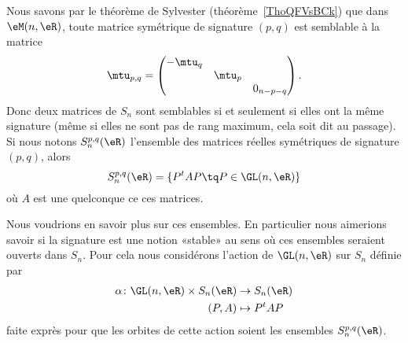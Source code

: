 Nous savons par le théorème de Sylvester (théorème~\ref{ThoQFVsBCk}) que dans \( \eM(n,\eR)\), toute matrice symétrique de signature \( (p,q)\) est semblable à la matrice
\begin{equation}
	\mtu_{p,q}=\begin{pmatrix}
		-\mtu_q &          &           \\
		        & \mtu_{p} &           \\
		        &          & 0_{n-p-q}
	\end{pmatrix}.
\end{equation}
Donc deux matrices de \( S_n\) sont semblables si et seulement si elles ont la même signature (même si elles ne sont pas de rang maximum, cela soit dit au passage). Si nous notons \( S_n^{p,q}(\eR)\) l'ensemble des matrices réelles symétriques de signature \( (p,q)\), alors
\begin{equation}
	S_n^{p,q}(\eR)=\{ P^tAP\tq P\in \GL(n,\eR) \}
\end{equation}
où \( A\) est une quelconque ce ces matrices.

Nous voudrions en savoir plus sur ces ensembles. En particulier nous aimerions savoir si la signature est une notion «stable» au sens où ces ensembles seraient ouverts dans \( S_n\). Pour cela nous considérons l'action de \( \GL(n,\eR)\) sur \( S_n\) définie par
\begin{equation}
	\begin{aligned}
		\alpha\colon \GL(n,\eR)\times S_n(\eR) & \to S_n(\eR)  \\
		(P,A)                                  & \mapsto P^tAP
	\end{aligned}
\end{equation}
faite exprès pour que les orbites de cette action soient les ensembles \( S_n^{p,q}(\eR)\).

